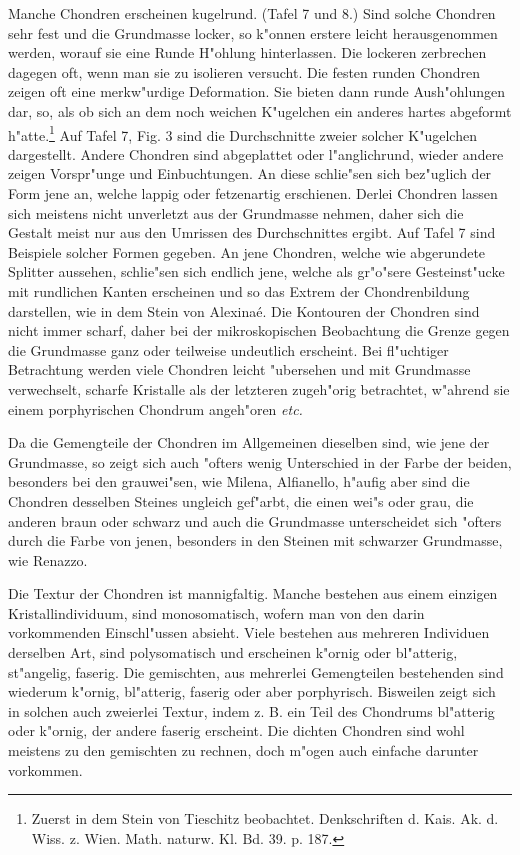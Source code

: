 \documentclass[a4paper, 11pt, oneside, polutonikogreek, german]{article}
\begin{document}
Manche Chondren erscheinen kugelrund. (Tafel 7 und 8.) Sind solche Chondren sehr fest und die Grundmasse locker, so k"onnen erstere leicht herausgenommen werden, worauf sie eine Runde H"ohlung hinterlassen. Die lockeren zerbrechen dagegen oft, wenn man sie zu isolieren versucht. Die festen runden Chondren zeigen oft eine merkw"urdige Deformation. Sie bieten dann runde Aush"ohlungen dar, so, als ob sich an dem noch weichen K"ugelchen ein anderes hartes abgeformt h"atte.\footnote{Zuerst in dem Stein von Tieschitz beobachtet. Denkschriften d. Kais. Ak. d. Wiss. z. Wien. Math. naturw. Kl. Bd. 39. p. 187.} Auf Tafel 7, Fig. 3 sind die Durchschnitte zweier solcher K"ugelchen dargestellt. Andere Chondren sind abgeplattet oder l"anglichrund, wieder andere zeigen Vorspr"unge und Einbuchtungen. An diese schlie"sen sich bez"uglich der Form jene an, welche lappig oder fetzenartig erschienen. Derlei Chondren lassen sich meistens nicht unverletzt aus der Grundmasse nehmen, daher sich die Gestalt meist nur aus den Umrissen des Durchschnittes ergibt. Auf Tafel 7 sind Beispiele solcher Formen gegeben. An jene Chondren, welche wie abgerundete Splitter aussehen, schlie"sen sich endlich jene, welche als gr"o"sere Gesteinst"ucke mit rundlichen Kanten erscheinen und so das Extrem der Chondrenbildung darstellen, wie in dem Stein von Alexinaé. Die Kontouren der Chondren sind nicht immer scharf, daher bei der mikroskopischen Beobachtung die Grenze gegen die Grundmasse ganz oder teilweise undeutlich erscheint. Bei fl"uchtiger Betrachtung werden viele Chondren leicht "ubersehen und mit Grundmasse verwechselt, scharfe Kristalle als der letzteren zugeh"orig betrachtet, w"ahrend sie einem porphyrischen Chondrum angeh"oren \emph{etc.}

Da die Gemengteile der Chondren im Allgemeinen dieselben sind, wie jene der Grundmasse, so zeigt sich auch "ofters wenig Unterschied in der Farbe der beiden, besonders bei den grauwei"sen, wie Milena, Alfianello, h"aufig aber sind die Chondren desselben Steines ungleich gef"arbt, die einen wei"s oder grau, die anderen braun oder schwarz und auch die Grundmasse unterscheidet sich "ofters durch die Farbe von jenen, besonders in den Steinen mit schwarzer Grundmasse, wie Renazzo.

Die Textur der Chondren ist mannigfaltig. Manche bestehen aus einem einzigen Kristallindividuum, sind monosomatisch, wofern man von den darin vorkommenden Einschl"ussen absieht. Viele bestehen aus mehreren Individuen derselben Art, sind polysomatisch und erscheinen k"ornig oder bl"atterig, st"angelig, faserig. Die gemischten, aus mehrerlei Gemengteilen bestehenden sind wiederum k"ornig, bl"atterig, faserig oder aber porphyrisch. Bisweilen zeigt sich in solchen auch zweierlei Textur, indem z. B. ein Teil des Chondrums bl"atterig oder k"ornig, der andere faserig erscheint. Die dichten Chondren sind wohl meistens zu den gemischten zu rechnen, doch m"ogen auch einfache darunter vorkommen.
\end{document}
